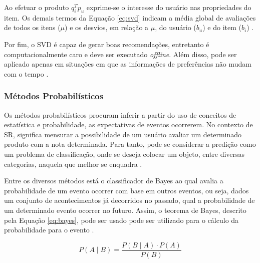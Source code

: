         Ao efetuar o produto $q^T_ip_u$ exprime-se o interesse do usuário nas propriedades do item. Os demais termos da Equação \ref{eq:svd} indicam a média global de avaliações de todos os itens ($\mu$) e os desvios, em relação a $\mu$, do usuário ($b_u$) e do item ($b_i$) \cite{Ricci2010}.
        
        Por fim, o SVD é capaz de gerar boas recomendações, entretanto é computacionalmente caro e deve ser executado \textit{offline}. Além disso, pode ser aplicado apenas em situações em que as informações de preferências não mudam com o tempo \cite{Bobadilla_2013}.
        
        \ProximoForaDoSumario
        \subsubsection{Métodos Probabilísticos}
        
        Os métodos probabilísticos procuram inferir a partir do uso de conceitos de estatística e probabilidade, as expectativas de eventos ocorrerem.  No contexto de SR, significa mensurar a possibilidade de um usuário avaliar um determinado produto com a nota determinada. Para tanto, pode se considerar a predição como um problema de classificação, onde se deseja colocar um objeto, entre diversas categorias, naquela que melhor se enquadra \cite{Jannach2010}.
                
        Entre os diversos métodos está o classificador de Bayes ao qual avalia a probabilidade de um evento ocorrer com base em outros eventos, ou seja, dados um conjunto de acontecimentos já decorridos no passado, qual a probabilidade de um determinado evento ocorrer no futuro. 
        Assim, o teorema de Bayes, descrito pela Equação \ref{eq:bayes}, pode ser usado pode ser utilizado para o cálculo da probabilidade para o evento \cite{Aggarwal2016}.
        
        \begin{equation}
            P(A \mid B) = \frac{P(B \mid A) \cdot P(A)}{P(B)} \label{eq:bayes}
        \end{equation}

        

